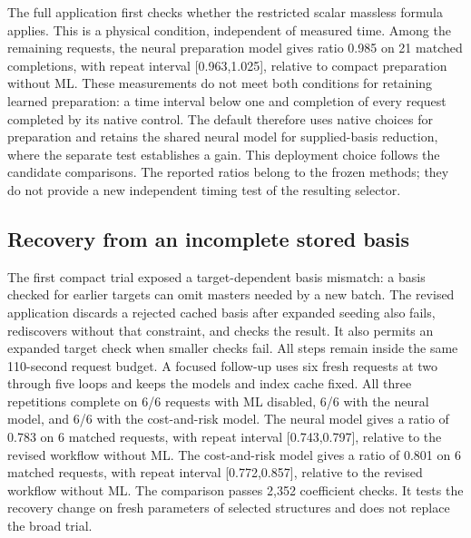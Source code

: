 The full application first checks whether the restricted scalar massless formula applies. This is a physical condition, independent of measured time. Among the remaining requests, the neural preparation model gives ratio 0.985 on 21 matched completions, with repeat interval [0.963,1.025], relative to compact preparation without ML. These measurements do not meet both conditions for retaining learned preparation: a time interval below one and completion of every request completed by its native control. The default therefore uses native choices for preparation and retains the shared neural model for supplied-basis reduction, where the separate test establishes a gain. This deployment choice follows the candidate comparisons. The reported ratios belong to the frozen methods; they do not provide a new independent timing test of the resulting selector.

\subsection{Recovery from an incomplete stored basis}
The first compact trial exposed a target-dependent basis mismatch: a basis checked for earlier targets can omit masters needed by a new batch. The revised application discards a rejected cached basis after expanded seeding also fails, rediscovers without that constraint, and checks the result. It also permits an expanded target check when smaller checks fail. All steps remain inside the same 110-second request budget. A focused follow-up uses six fresh requests at two through five loops and keeps the models and index cache fixed. All three repetitions complete on 6/6 requests with ML disabled, 6/6 with the neural model, and 6/6 with the cost-and-risk model. The neural model gives a ratio of 0.783 on 6 matched requests, with repeat interval [0.743,0.797], relative to the revised workflow without ML. The cost-and-risk model gives a ratio of 0.801 on 6 matched requests, with repeat interval [0.772,0.857], relative to the revised workflow without ML. The comparison passes 2,352 coefficient checks. It tests the recovery change on fresh parameters of selected structures and does not replace the broad trial.
